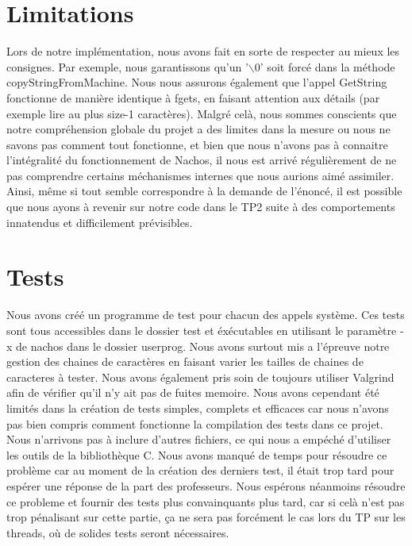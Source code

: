 \documentclass[12pt]{article}
\begin{document}
\section {Limitations}
Lors de notre implémentation, nous avons fait en sorte de respecter au mieux les consignes. Par exemple, nous garantissons qu'un '$\backslash$0' soit forcé dans la méthode \textcolor{red2}{copyStringFromMachine}. Nous nous assurons également que l'appel \textcolor{blue2}{GetString} fonctionne de manière identique à \textcolor{red2}{fgets}, en faisant attention aux détails (par exemple lire au plus size-1 caractères).
Malgré celà, nous sommes conscients que notre compréhension globale du projet a des limites dans la mesure ou nous ne savons pas comment tout fonctionne, et bien que nous n'avons pas à connaitre l'intégralité du fonctionnement de Nachos, il nous est arrivé régulièrement de ne pas comprendre certains méchanismes internes que nous aurions aimé assimiler.
Ainsi, même si tout semble correspondre à la demande de l'énoncé, il est possible que nous ayons à revenir sur notre code dans le TP2 suite à des comportements innatendus et difficilement prévisibles.



\section {Tests}

Nous avons créé un programme de test pour chacun des appels système. Ces tests sont tous accessibles dans le dossier test et éxécutables en utilisant le paramètre -x de nachos dans le dossier userprog.
Nous avons surtout mis a l'épreuve notre gestion des chaines de caractères en faisant varier les tailles de chaines de caracteres à tester. Nous avons également pris soin de toujours utiliser Valgrind afin de vérifier qu'il n'y ait pas de fuites memoire.
Nous avons cependant été limités dans la création de tests simples, complets et efficaces car nous n'avons pas bien compris comment fonctionne la compilation des tests dans ce projet. Nous n'arrivons pas à inclure d'autres fichiers, ce qui nous a empéché d'utiliser les outils de la bibliothèque C.
\newline \newline
Nous avons manqué de temps pour résoudre ce problème car au moment de la création des derniers test, il était trop tard pour espérer une réponse de la part des professeurs.
Nous espérons néanmoins résoudre ce probleme et fournir des tests plus convainquants plus tard, car si celà n'est pas trop pénalisant sur cette partie, ça ne sera pas forcément le cas lors du TP sur les threads, où de solides tests seront nécessaires.
\end{document}
